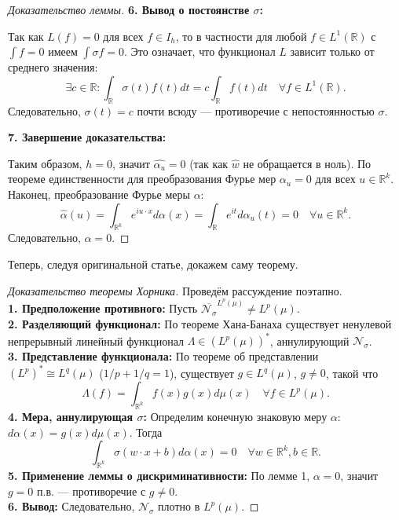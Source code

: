 \documentclass[../NDCNNAI_main.tex]{subfiles}
\begin{document}
\begin{proof}[Доказательство леммы]
\noindent
\textbf{6. Вывод о постоянстве $\sigma$:}

Так как $L(f) = 0$ для всех $f \in I_h$, то в частности для любой $f \in L^1(\mathbb{R})$ с $\int f = 0$ имеем $\int \sigma f = 0$. Это означает, что функционал $L$ зависит только от среднего значения:
\[
\exists c \in \mathbb{R}: \int_{\mathbb{R}} \sigma(t) f(t) dt = c \int_{\mathbb{R}} f(t) dt \quad \forall f \in L^1(\mathbb{R}).
\]
Следовательно, $\sigma(t) = c$ почти всюду --- противоречие с непостоянностью $\sigma$.

\noindent
\textbf{7. Завершение доказательства:}

Таким образом, $h = 0$, значит $\widehat{\alpha_u} = 0$ (так как $\widehat{w}$ не обращается в ноль). По теореме единственности для преобразования Фурье мер $\alpha_u = 0$ для всех $u \in \mathbb{R}^k$.
Наконец, преобразование Фурье меры $\alpha$:
\[
\widehat{\alpha}(u) = \int_{\mathbb{R}^k} e^{i u \cdot x} d\alpha(x) = \int_{\mathbb{R}} e^{i t} d\alpha_u(t) = 0 \quad \forall u \in \mathbb{R}^k.
\]
Следовательно, $\alpha = 0$.
\end{proof}

Теперь, следуя оригинальной статье, докажем саму теорему.

\begin{proof}[Доказательство теоремы Хорника]
Проведём рассуждение поэтапно.\\
\textbf{1. Предположение противного:} Пусть $\overline{\mathcal{N}_\sigma}^{L^p(\mu)} \neq L^p(\mu)$.\\
\textbf{2. Разделяющий функционал:} По теореме Хана-Банаха существует ненулевой непрерывный линейный функционал $\Lambda \in (L^p(\mu))^*$, аннулирующий $\mathcal{N}_\sigma$.\\
\textbf{3. Представление функционала:} По теореме об представлении $(L^p)^* \cong L^q(\mu)$ ($1/p + 1/q = 1$), существует $g \in L^q(\mu)$, $g \neq 0$, такой что
\[
\Lambda(f) = \int_{\mathbb{R}^k} f(x) g(x) d\mu(x) \quad \forall f \in L^p(\mu).
\]
\textbf{4. Мера, аннулирующая $\sigma$:} Определим конечную знаковую меру $\alpha$: $d\alpha(x) = g(x) d\mu(x)$. Тогда
\[
\int_{\mathbb{R}^k} \sigma(w \cdot x + b) d\alpha(x) = 0 \quad \forall w \in \mathbb{R}^k, b \in \mathbb{R}.
\]
\textbf{5. Применение леммы о дискриминативности:} По лемме 1, $\alpha = 0$, значит $g = 0$ п.в. --- противоречие с $g \neq 0$.\\
\textbf{6. Вывод:} Следовательно, $\mathcal{N}_\sigma$ плотно в $L^p(\mu)$.
\end{proof}
\end{document}
